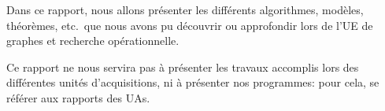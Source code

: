 
Dans ce rapport, nous allons présenter les différents algorithmes, modèles,
théorèmes, etc.\  que nous avons pu découvrir ou approfondir lors de l'UE de
graphes et recherche opérationnelle.

Ce rapport ne nous servira pas à présenter les travaux accomplis lors
des différentes unités d'acquisitions, ni à présenter nos programmes: pour
cela, se référer aux rapports des UAs.
